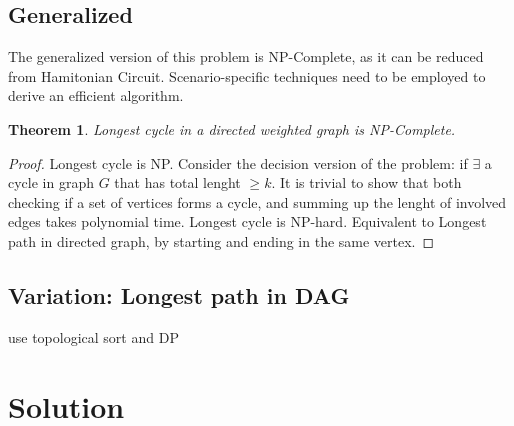 \documentclass{article}
\newtheorem{theorem}{Theorem}[section]
\begin{document}
\subsection*{Generalized}
The generalized version of this problem is NP-Complete, as it can be reduced from Hamitonian Circuit. Scenario-specific techniques need to be employed
to derive an efficient algorithm. 

\begin{theorem}
    Longest cycle in a directed weighted graph is NP-Complete.
\end{theorem}
\begin{proof} 
    Longest cycle is NP. \newline
    \newline
    Consider the decision version of the problem: if $\exists $ a cycle in graph $G$ that has total lenght $\geq k$.
    It is trivial to show that both checking if a set of vertices forms a cycle, and summing up the lenght of involved edges takes polynomial time. 
    \newline
    Longest cycle is NP-hard.\newline
    \newline
    Equivalent to Longest path in directed graph, by starting and ending in the same vertex.
\end{proof}
\subsection*{Variation: Longest path in DAG}
use topological sort and DP 
\section*{Solution}
\end{document}
